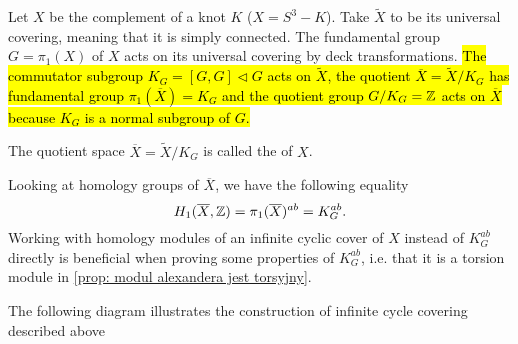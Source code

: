 Let $X$ be the complement of a knot $K$ ($X=S^3-K$). Take $\widetilde{X}$ to be its universal covering, meaning that it is simply connected. The fundamental group $G=\pi_1(X)$ of $X$ acts on its universal covering by deck transformations. \hl{The commutator subgroup $K_G=[G, G]\triangleleft G$ acts on $\widetilde{X}$, the quotient $\overline{X}=\widetilde{X}/K_G$ has fundamental group $\pi_1(\overline{X})=K_G$ and the quotient group $G/K_G=\operatorname{\mathbb{Z}}$ acts on $\overline{X}$ because $K_G$ is a normal subgroup of $G$.}

\begin{definition}
  The quotient space {\boldmath$\overline{X}=\widetilde{X}/K_G$} is called the  of $X$.
\end{definition}

Looking at homology groups of $\overline{X}$, we have the following equality
$$H_1(\overline{X}, \operatorname{\mathbb{Z}})=\pi_1(\overline{X})^{ab}=K_G^{ab}.$$
Working with homology modules of an infinite cyclic cover of $X$ instead of $K_G^{ab}$ directly is beneficial when proving some properties of $K_G^{ab}$, i.e. that it is a torsion module in \cref{prop: modul alexandera jest torsyjny}. 

The following diagram illustrates the construction of infinite cycle covering described above

\def\actson{
  \begin{tikzpicture}[baseline]
    \draw[->](0, 0) arc (-120:180:.5em);
  \end{tikzpicture}
}

\begin{center}
\end{center}

%

